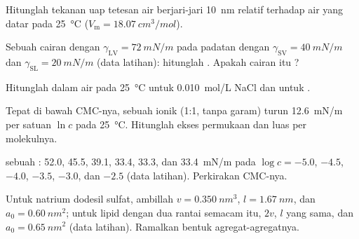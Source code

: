 \begin{exercise}[$\star$]\label{exo:b3:colloids:2}
Hitunglah tekanan uap tetesan air berjari-jari \qty{10}{nm} relatif terhadap
air yang datar pada \qty{25}{\celsius} ($V_{\mathrm m} = \qty{18.07}{cm^3/mol}$).
\end{exercise}

\begin{exercise}[$\star$]\label{exo:b3:colloids:3}
Sebuah cairan dengan $\gamma_{\mathrm{LV}} = \qty{72}{mN/m}$ pada padatan dengan $\gamma_{\mathrm{SV}} = \qty{40}{mN/m}$ dan $\gamma_{\mathrm{SL}} =
\qty{20}{mN/m}$ (data latihan): hitunglah . Apakah cairan itu ?
\end{exercise}

\begin{exercise}[$\star$]\label{exo:b3:colloids:4}
Hitunglah  dalam air pada \qty{25}{\celsius} untuk \qty{0.010}{mol/L} NaCl dan untuk
.
\end{exercise}

\begin{exercise}[$\star\star$]\label{exo:b3:colloids:5}
Tepat di bawah CMC-nya,  sebuah  ionik (1:1, tanpa garam)
turun \qty{12.6}{mN/m} per satuan $\ln c$ pada \qty{25}{\celsius}. Hitunglah ekses permukaan dan
luas per molekulnya.
\end{exercise}

\begin{exercise}[$\star\star$]\label{exo:b3:colloids:6}
 sebuah : 52.0, 45.5, 39.1, 33.4, 33.3, dan
\qty{33.4}{mN/m} pada $\log c = -5.0$, $-4.5$, $-4.0$, $-3.5$, $-3.0$, dan $-2.5$ (data latihan).
Perkirakan CMC-nya.
\end{exercise}

\begin{exercise}[$\star\star$]\label{exo:b3:colloids:7}
Untuk natrium dodesil sulfat, ambillah $v = \qty{0.350}{nm^3}$, $l = \qty{1.67}{nm}$, dan $a_0 = \qty{0.60}{nm^2}$; untuk
lipid dengan dua rantai semacam itu, $2v$, $l$ yang sama, dan $a_0 = \qty{0.65}{nm^2}$ (data
latihan). Ramalkan bentuk agregat-agregatnya.
\end{exercise}

